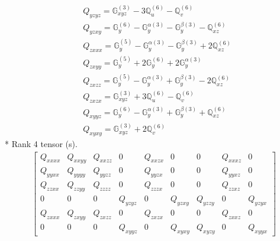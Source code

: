 \documentclass[fleqn,8pt,landscape]{jsarticle}
\begin{document}
\begin{align*}
& Q_{yzyz} = \mathbb{G}_{xyz}^{(3)} - 3 \mathbb{Q}_{u}^{(6)} - \mathbb{Q}_{v}^{(6)} \\
& Q_{yzxy} = \mathbb{G}_{y}^{(6)} - \mathbb{G}_{y}^{\alpha(3)} - \mathbb{G}_{y}^{\beta(3)} - \mathbb{Q}_{xz}^{(6)} \\
& Q_{zxxx} = \mathbb{G}_{y}^{(5)} - \mathbb{G}_{y}^{\alpha(3)} - \mathbb{G}_{y}^{\beta(3)} + 2 \mathbb{Q}_{xz}^{(6)} \\
& Q_{zxyy} = \mathbb{G}_{y}^{(5)} + 2 \mathbb{G}_{y}^{(6)} + 2 \mathbb{G}_{y}^{\alpha(3)} \\
& Q_{zxzz} = \mathbb{G}_{y}^{(5)} - \mathbb{G}_{y}^{\alpha(3)} + \mathbb{G}_{y}^{\beta(3)} - 2 \mathbb{Q}_{xz}^{(6)} \\
& Q_{zxzx} = \mathbb{G}_{xyz}^{(3)} + 3 \mathbb{Q}_{u}^{(6)} - \mathbb{Q}_{v}^{(6)} \\
& Q_{xyyz} = \mathbb{G}_{y}^{(6)} - \mathbb{G}_{y}^{\alpha(3)} + \mathbb{G}_{y}^{\beta(3)} + \mathbb{Q}_{xz}^{(6)} \\
& Q_{xyxy} = \mathbb{G}_{xyz}^{(3)} + 2 \mathbb{Q}_{v}^{(6)}
\end{align*}
* Rank 4 tensor (s).
\begin{align*}
\begin{bmatrix} Q_{xxxx} & Q_{xxyy} & Q_{xxzz} & 0 & Q_{xxzx} & 0 & 0 & Q_{xxxz} & 0 \\ Q_{yyxx} & Q_{yyyy} & Q_{yyzz} & 0 & Q_{yyzx} & 0 & 0 & Q_{yyxz} & 0 \\ Q_{zzxx} & Q_{zzyy} & Q_{zzzz} & 0 & Q_{zzzx} & 0 & 0 & Q_{zzxz} & 0 \\ 0 & 0 & 0 & Q_{yzyz} & 0 & Q_{yzxy} & Q_{yzzy} & 0 & Q_{yzyx} \\ Q_{zxxx} & Q_{zxyy} & Q_{zxzz} & 0 & Q_{zxzx} & 0 & 0 & Q_{zxxz} & 0 \\ 0 & 0 & 0 & Q_{xyyz} & 0 & Q_{xyxy} & Q_{xyzy} & 0 & Q_{xyyx} \end{bmatrix}
\end{align*}
\end{document}
